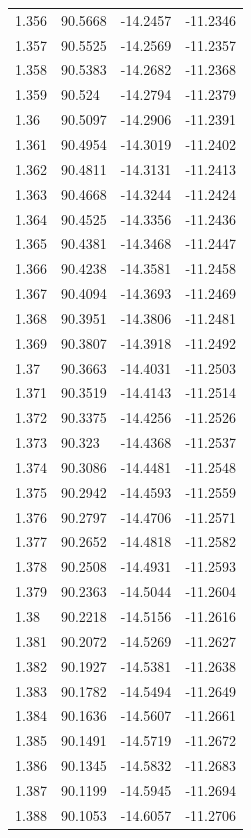 \begin{tabular}{llll}
1.356 & 90.5668 & -14.2457 & -11.2346 \\
1.357 & 90.5525 & -14.2569 & -11.2357 \\
1.358 & 90.5383 & -14.2682 & -11.2368 \\
1.359 & 90.524 & -14.2794 & -11.2379 \\
1.36 & 90.5097 & -14.2906 & -11.2391 \\
1.361 & 90.4954 & -14.3019 & -11.2402 \\
1.362 & 90.4811 & -14.3131 & -11.2413 \\
1.363 & 90.4668 & -14.3244 & -11.2424 \\
1.364 & 90.4525 & -14.3356 & -11.2436 \\
1.365 & 90.4381 & -14.3468 & -11.2447 \\
1.366 & 90.4238 & -14.3581 & -11.2458 \\
1.367 & 90.4094 & -14.3693 & -11.2469 \\
1.368 & 90.3951 & -14.3806 & -11.2481 \\
1.369 & 90.3807 & -14.3918 & -11.2492 \\
1.37 & 90.3663 & -14.4031 & -11.2503 \\
1.371 & 90.3519 & -14.4143 & -11.2514 \\
1.372 & 90.3375 & -14.4256 & -11.2526 \\
1.373 & 90.323 & -14.4368 & -11.2537 \\
1.374 & 90.3086 & -14.4481 & -11.2548 \\
1.375 & 90.2942 & -14.4593 & -11.2559 \\
1.376 & 90.2797 & -14.4706 & -11.2571 \\
1.377 & 90.2652 & -14.4818 & -11.2582 \\
1.378 & 90.2508 & -14.4931 & -11.2593 \\
1.379 & 90.2363 & -14.5044 & -11.2604 \\
1.38 & 90.2218 & -14.5156 & -11.2616 \\
1.381 & 90.2072 & -14.5269 & -11.2627 \\
1.382 & 90.1927 & -14.5381 & -11.2638 \\
1.383 & 90.1782 & -14.5494 & -11.2649 \\
1.384 & 90.1636 & -14.5607 & -11.2661 \\
1.385 & 90.1491 & -14.5719 & -11.2672 \\
1.386 & 90.1345 & -14.5832 & -11.2683 \\
1.387 & 90.1199 & -14.5945 & -11.2694 \\
1.388 & 90.1053 & -14.6057 & -11.2706 \\

\end{tabular}
